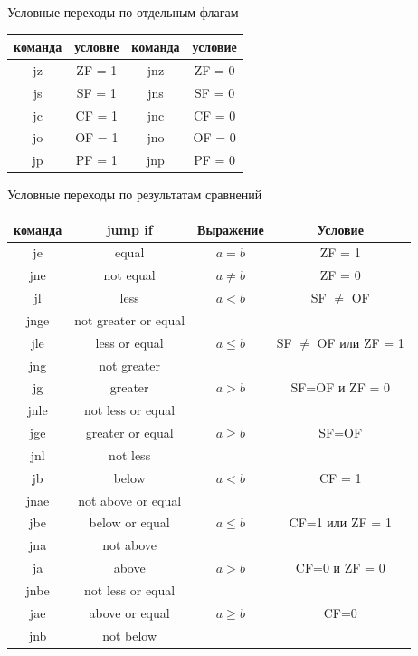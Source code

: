 \documentclass[utf8, russian]{beamer}
\begin{document}
    \begin{frame}{Условные переходы по отдельным флагам}
        \begin{table}
            \begin{tabular}{|c|c||c|c|}
                \hline команда & условие & команда & условие \\
                \hline jz & ZF = 1 & jnz & ZF = 0 \\
                \hline js & SF = 1 & jns & SF = 0 \\
                \hline jc & CF = 1 & jnc & CF = 0 \\
                \hline jo & OF = 1 & jno & OF = 0 \\
                \hline jp & PF = 1 & jnp & PF = 0 \\
                \hline
            \end{tabular}
        \end{table}
    \end{frame}
    \begin{frame}{Условные переходы по результатам сравнений}
        \begin{table}\footnotesize
            \begin{tabular}{|c|c|c|c|}
                \hline команда & jump if & Выражение & Условие \\
                \hline je & equal & $a=b$ & ZF = 1 \\
                       jne & not equal & $a \ne b$ & ZF = 0 \\
                \hline jl & less & $a < b$ & SF $\ne$ OF \\
                       jnge & not greater or equal  & & \\
                \hline jle & less or equal & $a \le b$ & SF $\ne$ OF или ZF = 1\\
                       jng & not greater & & \\
                \hline jg  & greater & $a > b$ & SF=OF и ZF = 0 \\
                       jnle & not less or equal & & \\
                \hline jge & greater or equal & $a \ge b$ & SF=OF \\
                       jnl & not less & & \\
                \hline jb & below & $a < b$ & CF = 1 \\
                       jnae & not above or equal  & & \\
                \hline jbe & below or equal & $a \le b$ & CF=1 или ZF = 1\\
                       jna & not above & & \\
                \hline ja  & above & $a > b$ & CF=0 и ZF = 0 \\
                       jnbe & not less or equal & & \\
                \hline jae & above or equal & $a \ge b$ & CF=0 \\
                       jnb & not below & & \\
                \hline
            \end{tabular}
        \end{table}
    \end{frame}
\end{document}
